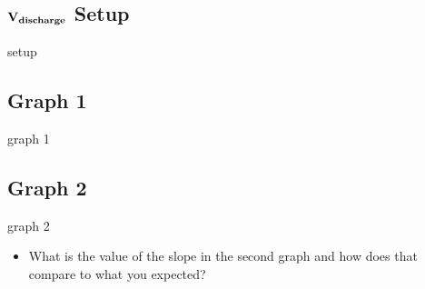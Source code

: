 \documentclass{article}
\def\F#1{\(\bf#1\)}
\begin{document}
\begin{center}
  \subsection*{\F{V_{discharge}} Setup}
  setup
\end{center}
\begin{center}
  \subsection*{Graph 1}
  graph 1
  \subsection*{Graph 2}
  graph 2
\end{center}
\begin{itemize}
  \item What is the value of the slope in the second graph and how does that compare to what you expected?
\end{itemize}
\end{document}
